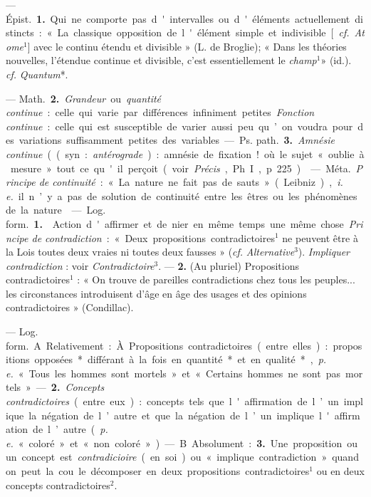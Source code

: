 \begin{itemize}[leftmargin=1cm, label=, itemsep=11pt]
 — \si{Épist.} {\bf 1.} Qui ne comporte
pas d'intervalles ou d'éléments
actuellement distincts : « La classique
opposition de l'élément simple
et indivisible [{\it cf.} {\it Atome}$^1$] avec le
continu étendu et divisible » (L. de
Broglie); « Dans les théories nouvelles, l'étendue continue et divisible, c'est essentiellement le {\it champ}$^1$»
(id.). {\it cf.} {\it Quantum}*.

— \si{Math.} {\bf 2.} {\it Grandeur} ou {\it quantité
continue} : celle qui varie par différences infiniment petites. {\it Fonction
continue} : celle qui est susceptible de
varier aussi peu qu’on voudra pour
des variations suffisamment petites
des variables.

— \si{Ps. path.} {\bf 3.} {\it Amnésie continue}
((syn. : {\it antérograde}) : amnésie de
fixation! où le sujet « oublie à mesure » tout ce qu'il perçoit (voir
 {\it Précis}, Ph. I, p. 225).

 — \si{Méta.} {\it Principe de continuité} : « La nature ne fait pas de
sauts » (Leibniz), {\it i. e.} il n’y a pas de
solution de continuité entre les êtres
ou les phénomènes de la nature.

 — \si{Log. form.} {\bf 1.} 
Action d'affirmer et de nier en même
temps une même chose. {\it Principe de
contradiction} : « Deux propositions
contradictoires$^1$ ne peuvent être à la
Lois toutes deux vraies ni toutes deux
fausses » ({\it cf.} {\it Alternative}$^3$). {\it Impliquer contradiction} : voir {\it Contradictoire}$^3$. — {\bf 2.}  (Au pluriel) Propositions contradictoires$^1$ : « On trouve
de pareilles contradictions chez
tous les peuples... les circonstances
introduisent d'âge en âge des usages
et des opinions contradictoires »
(Condillac).

 — \si{Log. form.} A. Relativement : À. Propositions contradictoires (entre elles) : propositions
opposées* différant à la fois en
quantité* et en qualité*, {\it p. e.} « Tous
les hommes sont mortels » et « Certains hommes ne sont pas mortels ».

— {\bf 2.} {\it Concepts contradictoires} (entre
eux) : concepts tels que l'affirmation
de l’un implique la négation de
l’autre et que la négation de l’un
implique l'affirmation de l’autre
({\it p. e.} « coloré » et « non coloré »). —
B. Absolument : {\bf 3.} Une proposition
ou un concept est {\it contradicioire} (en
soi) ou « implique contradiction »
quand on peut la cou le décomposer
en deux propositions contradictoires$^1$ ou en deux concepts contradictoires$^2$.


\end{itemize}
